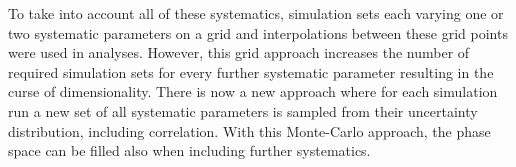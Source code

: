To take into account all of these systematics, simulation sets each varying one or two systematic parameters on a grid and interpolations between these grid points were used in analyses.
However, this grid approach increases the number of required simulation sets for every further systematic parameter resulting in the curse of dimensionality.
There is now a new approach \cite{IceCube2019SnowStorm} where for each simulation run a new set of all systematic parameters is sampled from their uncertainty distribution, including correlation.
With this Monte-Carlo approach, the phase space can be filled also when including further systematics.
